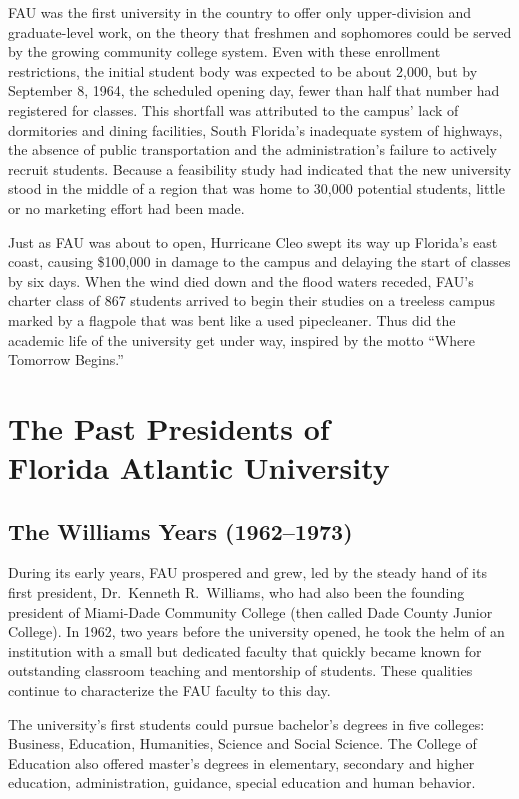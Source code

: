 \documentclass[phd, 12pt, print]{fauthesis}
\begin{document}
FAU was the first university in the country to offer only upper-division and graduate-level work, on the theory that freshmen and sophomores could be served by the growing community college system.  Even with these enrollment restrictions, the initial student body was expected to be about 2,000, but by September 8, 1964, the scheduled opening day, fewer than half that number had registered for classes.  This shortfall was attributed to the campus' lack of dormitories and dining facilities, South Florida's inadequate system of highways, the absence of public transportation and the administration's failure to actively recruit students.  Because a feasibility study had indicated that the new university stood in the middle of a region that was home to 30,000 potential students, little or no marketing effort had been made.

Just as FAU was about to open, Hurricane Cleo swept its way up Florida's east coast, causing \$100,000 in damage to the campus and delaying the start of classes by six days.  When the wind died down and the flood waters receded, FAU's charter class of 867 students arrived to begin their studies on a treeless campus marked by a flagpole that was bent like a used pipecleaner.  Thus did the academic life of the university get under way, inspired by the motto ``Where Tomorrow Begins.''


\chapter[The Past Presidents of Florida Atlantic University]{The Past Presidents of\\ Florida Atlantic University}

\section{The Williams Years (1962--1973)}

During its early years, FAU prospered and grew, led by the steady hand of its first president, Dr.\ Kenneth R.\ Williams, who had also been the founding president of Miami-Dade Community College (then called Dade County Junior College).  In 1962, two years before the university opened, he took the helm of an institution with a small but dedicated faculty that quickly became known for outstanding classroom teaching and mentorship of students.  These qualities continue to characterize the FAU faculty to this day.

The university's first students could pursue bachelor's degrees in five colleges: Business, Education, Humanities, Science and Social Science.  The College of Education also offered master's degrees in elementary, secondary and higher education, administration, guidance, special education and human behavior.
\end{document}
